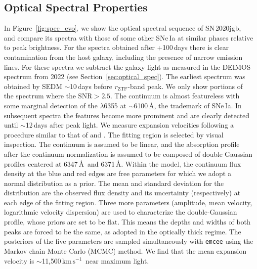 \documentclass[twocolumn]{aastex631}
\newcommand{\sn}{SN\,2020jgb}
\newcommand{\kms}{$\mathrm{km}\,\mathrm{s}^{-1}$}
\begin{document}
\subsection{Optical Spectral Properties}
In Figure~\ref{fig:spec_evo}, we show the optical spectral sequence of \sn, and compare its spectra with those of some other SNe\,Ia at similar phases relative to peak brightness. For the spectra obtained after +100\,days there is clear contamination from the host galaxy, including the presence of narrow emission lines. For these spectra we subtract the galaxy light as measured in the DEIMOS spectrum from 2022 (see Section~\ref{sec:optical_spec}). The earliest spectrum was obtained by SEDM $\sim$10\,days before $r_\mathrm{ZTF}$-band peak. We only show portions of the spectrum where the $\mathrm{SNR}>2.5$. The continuum is almost featureless with some marginal detection of the  $\lambda$6355 at $\sim$6100\,\AA, the trademark of SNe\,Ia. In subsequent spectra the  features become more prominent and are clearly detected until $\sim$12\,days after peak light. We measure  expansion velocities following a procedure similar to that of  \citet{Childress_2013,Childress_2014} and \citet{Maguire_2014}. The fitting region is selected by visual inspection. The continuum is assumed to be linear, and the absorption profile after the continuum normalization is assumed to be composed of double Gaussian profiles centered at 6347\,\AA\ and 6371\,\AA. Within the model, the continuum flux density at the blue and red edges are free parameters for which we adopt a normal distribution as a prior. The mean and standard deviation for the distribution are the observed flux density and its uncertainty (respectively) at each edge of the fitting region. Three more parameters (amplitude, mean velocity, logarithmic velocity dispersion) are used to characterize the double-Gaussian profile, whose priors are set to be flat. This means the depths and widths of both peaks are forced to be the same, as \citet{Maguire_2014} adopted in the optically thick regime. The posteriors of the five parameters are sampled simultaneously with \texttt{emcee} \citep{emcee_2013} using the Markov chain Monte Carlo (MCMC) method. We find that the mean expansion velocity is $\sim$11,500\,\kms\ near maximum light.

\end{document}
